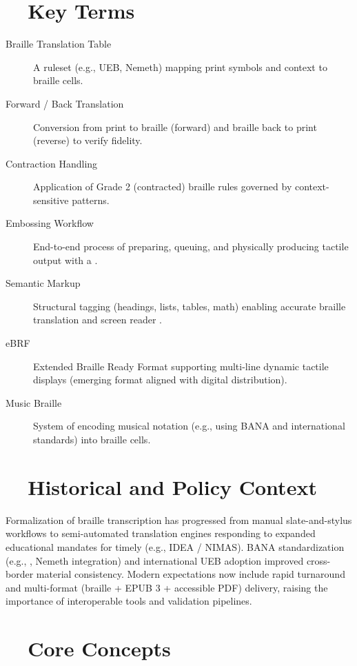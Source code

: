 \section{~~Key Terms}\label{ch12:sec:key-terms}
\begin{description}
	\item[Braille Translation Table] A ruleset (e.g., UEB, Nemeth) mapping print symbols and context to braille cells.
	\item[Forward / Back Translation] Conversion from print to braille (forward) and braille back to print (reverse) to verify fidelity.
	\item[Contraction Handling] Application of Grade 2 (contracted) braille rules governed by context-sensitive patterns.
	\item[Embossing Workflow] End-to-end process of preparing, queuing, and physically producing tactile output with a .
	\item[Semantic Markup] Structural tagging (headings, lists, tables, math) enabling accurate braille translation and screen reader .
	\item[eBRF] Extended Braille Ready Format supporting multi-line dynamic tactile displays (emerging format aligned with digital distribution).
	\item[Music Braille] System of encoding musical notation (e.g., using BANA and international standards) into braille cells.
\end{description}

\section{~~Historical and Policy Context}\label{ch12:sec:historical-policy}
Formalization of braille transcription has progressed from manual slate-and-stylus workflows to semi-automated translation engines responding to expanded educational mandates for timely  (e.g., IDEA / NIMAS\supercite{USDeptEducation2021}). BANA standardization (e.g., , Nemeth integration) and international UEB adoption improved cross-border material consistency. Modern expectations now include rapid turnaround and multi-format (braille + EPUB 3\supercite{ElsevierEPUB3} + accessible PDF) delivery, raising the importance of interoperable tools and validation pipelines.

\section{~~Core Concepts}\label{ch12:sec:core-concepts}
